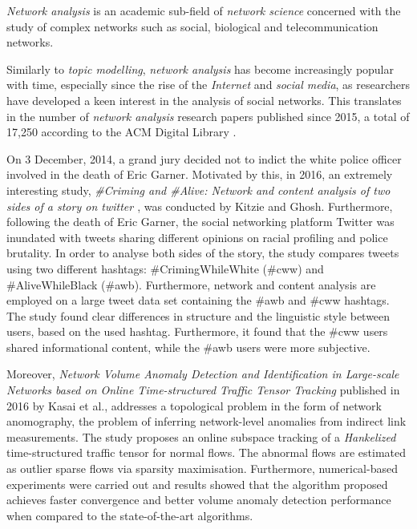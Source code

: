 \textit{Network analysis} is an academic sub-field of \textit{network science} concerned with the study of complex networks such as social, biological and telecommunication networks.

Similarly to \textit{topic modelling}, \textit{network analysis} has become increasingly popular with time, especially since the rise of the \textit{Internet} and \textit{social media}, as researchers have developed a keen interest in the analysis of social networks. This translates in the number of \textit{network analysis} research papers published since 2015, a total of 17,250 according to the ACM Digital Library \cite{acm_digital_library}.

On 3 December, 2014, a grand jury decided not to indict the white police officer involved in the death of Eric Garner. Motivated by this, in 2016, an extremely interesting study, \textit{\#Criming and \#Alive: Network and content analysis of two sides of a story on twitter \cite{kitzie2015criming}}, was conducted by Kitzie and Ghosh.
Furthermore, following the death of Eric Garner, the social networking platform Twitter was inundated with tweets sharing different opinions on racial profiling and police brutality. In order to analyse both sides of the story, the study compares tweets using two different hashtags: \#CrimingWhileWhite (\#cww) and \#AliveWhileBlack (\#awb). Furthermore, network and content analysis are employed on a large tweet data set containing the \#awb and \#cww hashtags. The study found clear differences in structure and the linguistic style between users, based on the used hashtag. Furthermore, it found that the \#cww users shared informational content, while the \#awb users were more subjective.

Moreover, \textit{Network Volume Anomaly Detection and Identification in Large-scale Networks based on Online Time-structured Traffic Tensor Tracking}  \cite{kasai2016network} published in 2016 by Kasai et al., addresses a topological problem in the form of network anomography, the problem of inferring network-level anomalies from indirect link measurements. The study proposes an online subspace tracking of a \textit{Hankelized} time-structured traffic tensor for normal flows. The abnormal flows are estimated as outlier sparse flows via sparsity maximisation. Furthermore, numerical-based experiments were carried out and results showed that the algorithm proposed achieves faster convergence and better volume anomaly detection performance when compared to the state-of-the-art algorithms.

